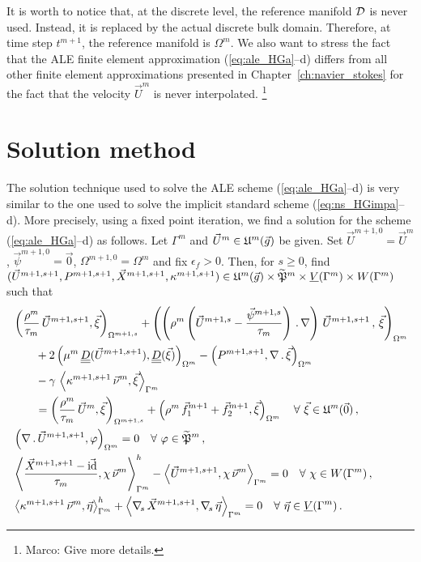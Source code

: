 It is worth to notice that, at the discrete level, the reference manifold $\D$
is never used. Instead, it is replaced by the actual discrete bulk domain.
Therefore, at time step $t^{m+1}$, the reference manifold is $\Omega^m$. We
also want to stress the fact that the ALE finite element approximation
(\ref{eq:ale_HGa}--d) differs from all other finite element approximations
presented in Chapter~\ref{ch:navier_stokes} for the fact that the velocity $\vec
U^m$ is never interpolated.
\footnote{Marco: Give more details.}

\section{Solution method}\label{sec:ale_solution_method}
The solution technique used to solve the ALE scheme (\ref{eq:ale_HGa}--d) is
very similar to the one used to solve the implicit standard scheme
(\ref{eq:ns_HGimpa}--d). More precisely, using a fixed point iteration, we find
a solution for the scheme (\ref{eq:ale_HGa}--d) as follows. Let $\Gamma^m$
and $\vec U^m\in \uspacediscale{g}{m}$ be given.
Set $\vec U^{m+1,0}=\vec U^m$, $\vec \psi^{m+1,0} =
\vec 0$, $\Omega^{m+1,0}=\Omega^m$ and fix $\epsilon_f > 0$.
Then, for $s \geq 0$,
find $(\vec U^{m+1,s+1},P^{m+1,s+1}, \vec X^{m+1,s+1}, \kappa^{m+1,s+1}) \in
\uspacediscale{g}{m}\times \pnormspaceale^m \times \Vh \times \Wh$ such that
\begin{subequations}
\begin{align}
& \left( \frac{\rho^m}{\tau_m}\,\vec U^{m+1,s+1}, \vec
\xi\right)_{\Omega^{m+1,s}} + \left(\left(\rho^m\left(\vec
U^{m+1,s}-\frac{\vec\psi^{m+1,s}}{\tau_m}\right)\,.\,\nabla\right)\,
\vec U^{m+1,s+1}\,, \,\vec \xi \right)_{\Omega^m}\nonumber \\
& \qquad + 2\left(\mu^m\,\mat D(\vec U^{m+1,s+1}), \mat D(\vec \xi)
\right)_{\Omega^m} - \left(P^{m+1,s+1}, \nabla\,.\,\vec \xi\right)_{\Omega^m}
\nonumber \\
& \qquad - \gamma\,\left\langle \kappa^{m+1,s+1}\,\vec\nu^m,
\vec\xi\right\rangle_{\Gamma^m} \nonumber \\
& \qquad = \left(\frac{\rho^m}{\tau_m}\,\vec U^m,\vec \xi
\right)_{\Omega^{m+1,s}}
+ \left(\rho^m\,\vec f_1^{m+1}+\vec f_2^{m+1}, \vec \xi\right)_{\Omega^m}
\quad \forall\ \vec\xi \in \uspacediscale{0}{m}\,, \label{eq:ns_HGalea} \\
& \left(\nabla\,.\,\vec U^{m+1,s+1}, \varphi\right)_{\Omega^m}  = 0
\quad \forall\ \varphi \in \pnormspaceale^m\,,\label{eq:ns_HGaleb} \\
&  \left\langle \frac{\vec X^{m+1,s+1} - \vec\id}{\tau_m} ,\chi\,\vec\nu^m
\right\rangle_{\Gamma^m}^h - \left\langle \vec U^{m+1,s+1}, \chi\,\vec\nu^m
\right\rangle_{\Gamma^m}  = 0 \quad \forall\ \chi \in \Wh\,,
\label{eq:ns_HGalec}\\
& \left\langle \kappa^{m+1,s+1}\,\vec\nu^m, \vec\eta \right\rangle_{\Gamma^m}^h
+ \left\langle \nabs\,\vec X^{m+1,s+1}, \nabs\,\vec \eta
\right\rangle_{\Gamma^m} = 0 \quad \forall\ \vec\eta \in \Vh\,.
\label{eq:ns_HGaled}
\end{align}
\end{subequations}
